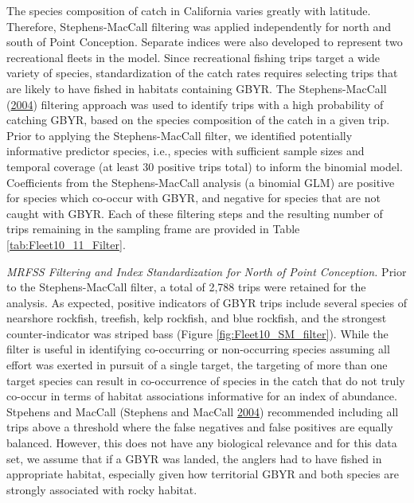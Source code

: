 \documentclass[12pt,]{article}
\begin{document}
The species composition of catch in California varies greatly with
latitude.\\
Therefore, Stephens-MacCall filtering was applied independently for
north and south of Point Conception. Separate indices were also
developed to represent two recreational fleets in the model. Since
recreational fishing trips target a wide variety of species,
standardization of the catch rates requires selecting trips that are
likely to have fished in habitats containing GBYR. The Stephens-MacCall
(\protect\hyperlink{ref-Stephens2004}{2004}) filtering approach was used
to identify trips with a high probability of catching GBYR, based on the
species composition of the catch in a given trip. Prior to applying the
Stephens-MacCall filter, we identified potentially informative predictor
species, i.e., species with sufficient sample sizes and temporal
coverage (at least 30 positive trips total) to inform the binomial
model. Coefficients from the Stephens-MacCall analysis (a binomial GLM)
are positive for species which co-occur with GBYR, and negative for
species that are not caught with GBYR. Each of these filtering steps and
the resulting number of trips remaining in the sampling frame are
provided in Table \ref{tab:Fleet10_11_Filter}.

\emph{MRFSS Filtering and Index Standardization for North of Point
Conception.} Prior to the Stephens-MacCall filter, a total of 2,788
trips were retained for the analysis. As expected, positive indicators
of GBYR trips include several species of nearshore rockfish, treefish,
kelp rockfish, and blue rockfish, and the strongest counter-indicator
was striped bass (Figure \ref{fig:Fleet10_SM_filter}). While the filter
is useful in identifying co-occurring or non-occurring species assuming
all effort was exerted in pursuit of a single target, the targeting of
more than one target species can result in co-occurrence of species in
the catch that do not truly co-occur in terms of habitat associations
informative for an index of abundance. Stpehens and MacCall (Stephens
and MacCall \protect\hyperlink{ref-Stephens2004}{2004}) recommended
including all trips above a threshold where the false negatives and
false positives are equally balanced. However, this does not have any
biological relevance and for this data set, we assume that if a GBYR was
landed, the anglers had to have fished in appropriate habitat,
especially given how territorial GBYR and both species are strongly
associated with rocky habitat.
\end{document}
